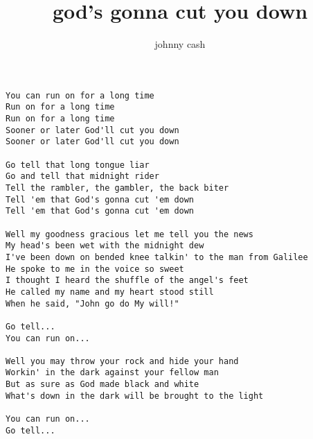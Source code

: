 \author{johnny cash}
\title{god's gonna cut you down}
\maketitle
\begin{verbatim}
You can run on for a long time
Run on for a long time
Run on for a long time
Sooner or later God'll cut you down
Sooner or later God'll cut you down

Go tell that long tongue liar
Go and tell that midnight rider
Tell the rambler, the gambler, the back biter
Tell 'em that God's gonna cut 'em down
Tell 'em that God's gonna cut 'em down

Well my goodness gracious let me tell you the news
My head's been wet with the midnight dew
I've been down on bended knee talkin' to the man from Galilee
He spoke to me in the voice so sweet
I thought I heard the shuffle of the angel's feet
He called my name and my heart stood still
When he said, "John go do My will!"

Go tell...
You can run on...

Well you may throw your rock and hide your hand
Workin' in the dark against your fellow man
But as sure as God made black and white
What's down in the dark will be brought to the light

You can run on...
Go tell...
\end{verbatim}